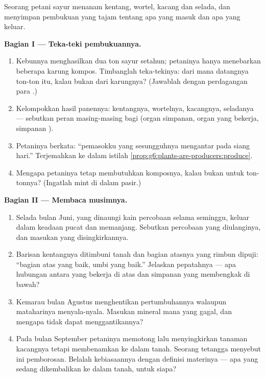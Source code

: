 \begin{problem}\label{pb:g6:plants-are-producers:1}
Seorang petani sayur menanam kentang, wortel, kacang dan selada, dan
menyimpan pembukuan yang tajam tentang apa yang masuk dan apa yang
keluar.

\medskip\noindent\textbf{Bagian I --- Teka-teki pembukuannya.}
\begin{enumerate}
  \item Kebunnya menghasilkan dua ton sayur setahun; petaninya hanya
        menebarkan beberapa karung kompos. Timbanglah teka-tekinya:
        dari mana datangnya ton-ton itu, kalau bukan dari karungnya?
        (Jawablah dengan perdagangan para .)
  \item Kelompokkan hasil panennya: kentangnya, wortelnya, 
        kacangnya,  seladanya --- sebutkan peran masing-masing
        bagi  (organ simpanan, organ yang bekerja, simpanan
        ).
  \item Petaninya berkata: ``pemasokku yang sesungguhnya mengantar
        pada siang hari.'' Terjemahkan ke dalam istilah
        \cref{prop:g6:plants-are-producers:produce}.
  \item Mengapa petaninya tetap membutuhkan komposnya, kalau bukan
        untuk ton-tonnya? (Ingatlah  mint di dalam pasir.)
\end{enumerate}

\medskip\noindent\textbf{Bagian II --- Membaca musimnya.}
\begin{enumerate}[resume]
  \item Selada bulan Juni, yang dinaungi kain percobaan selama
        seminggu, keluar dalam keadaan pucat dan memanjang. Sebutkan
        percobaan yang diulanginya, dan masukan yang disingkirkannya.
  \item Barisan kentangnya ditimbuni tanah dan bagian atasnya yang
        rimbun dipuji: ``bagian atas yang baik, umbi yang baik.''
        Jelaskan pepatahnya --- apa hubungan antara  yang bekerja
        di atas dan simpanan yang membengkak di bawah?
  \item Kemarau bulan Agustus menghentikan pertumbuhannya walaupun
        mataharinya menyala-nyala. Masukan mineral mana yang gagal,
        dan mengapa  tidak dapat menggantikannya?
  \item Pada bulan September petaninya memotong lalu menyingkirkan
        tanaman kacangnya tetapi membenamkan  ke dalam tanah.
        Seorang tetangga menyebut ini pemborosan. Belalah kebiasaannya
        dengan definisi materinya --- apa yang sedang dikembalikan ke
        dalam tanah, untuk siapa?
\end{enumerate}


\end{problem}
